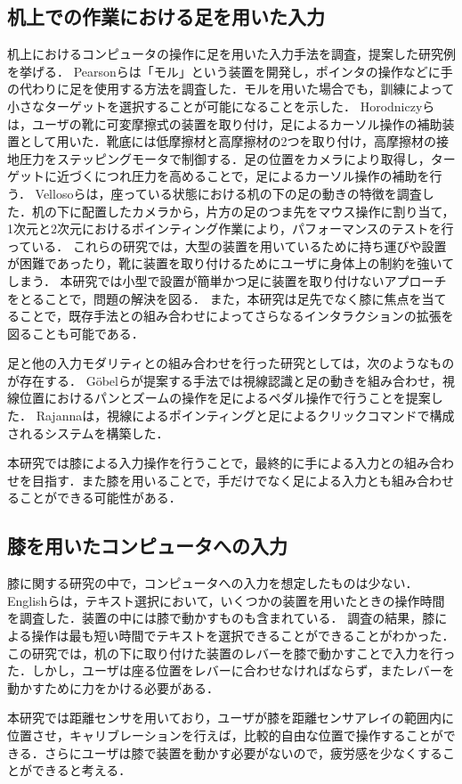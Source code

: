 \documentclass[submit, techrep]{ipsj}
\begin{document}
\subsection{机上での作業における足を用いた入力}
机上におけるコンピュータの操作に足を用いた入力手法を調査，提案した研究例を挙げる．
Pearsonら\cite{Pearson:1986:MMD:22627.22392, Pearson:1988:EEP:57167.57169}は「モル」という装置を開発し，ポインタの操作などに手の代わりに足を使用する方法を調査した．モルを用いた場合でも，訓練によって小さなターゲットを選択することが可能になることを示した．
Horodniczyら\cite{Horodniczy:2017:FHE:3025453.3025625}は，ユーザの靴に可変摩擦式の装置を取り付け，足によるカーソル操作の補助装置として用いた．靴底には低摩擦材と高摩擦材の2つを取り付け，高摩擦材の接地圧力をステッピングモータで制御する．足の位置をカメラにより取得し，ターゲットに近づくにつれ圧力を高めることで，足によるカーソル操作の補助を行う．
Vellosoら\cite{velloso:hal-01599657}は，座っている状態における机の下の足の動きの特徴を調査した．机の下に配置したカメラから，片方の足のつま先をマウス操作に割り当て，1次元と2次元におけるポインティング作業により，パフォーマンスのテストを行っている．
これらの研究では，大型の装置を用いているために持ち運びや設置が困難であったり，靴に装置を取り付けるためにユーザに身体上の制約を強いてしまう．
本研究では小型で設置が簡単かつ足に装置を取り付けないアプローチをとることで，問題の解決を図る．
また，本研究は足先でなく膝に焦点を当てることで，既存手法との組み合わせによってさらなるインタラクションの拡張を図ることも可能である．\par
足と他の入力モダリティとの組み合わせを行った研究としては，次のようなものが存在する．
G\"{o}belら\cite{Gobel:2013:GFI:2468356.2479610}が提案する手法では視線認識と足の動きを組み合わせ，視線位置におけるパンとズームの操作を足によるペダル操作で行うことを提案した．
Rajanna\cite{Rajanna:2016:GFI:2876456.2876462}は，視線によるポインティングと足によるクリックコマンドで構成されるシステムを構築した．\par
本研究では膝による入力操作を行うことで，最終的に手による入力との組み合わせを目指す．また膝を用いることで，手だけでなく足による入力とも組み合わせることができる可能性がある．

\subsection{膝を用いたコンピュータへの入力}
膝に関する研究の中で，コンピュータへの入力を想定したものは少ない．
Englishら\cite{1698228}は，テキスト選択において，いくつかの装置を用いたときの操作時間を調査した．装置の中には膝で動かすものも含まれている．
調査の結果，膝による操作は最も短い時間でテキストを選択できることができることがわかった．
この研究では，机の下に取り付けた装置のレバーを膝で動かすことで入力を行った．しかし，ユーザは座る位置をレバーに合わせなければならず，またレバーを動かすために力をかける必要がある．\par
本研究では距離センサを用いており，ユーザが膝を距離センサアレイの範囲内に位置させ，キャリブレーションを行えば，比較的自由な位置で操作することができる．さらにユーザは膝で装置を動かす必要がないので，疲労感を少なくすることができると考える．
\end{document}
